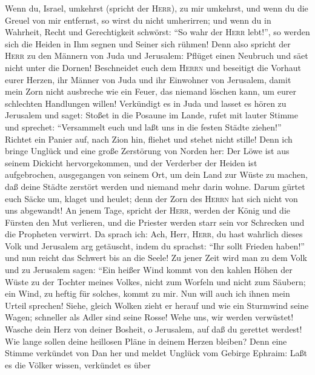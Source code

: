  Wenn du, Israel, umkehrst (spricht der \textsc{Herr}), zu
mir umkehrst, und wenn du die Greuel von mir entfernst, so wirst du
nicht umherirren;  und wenn du in Wahrheit, Recht und
Gerechtigkeit schwörst: ``So wahr der \textsc{Herr} lebt!'', so werden
sich die Heiden in Ihm segnen und Seiner sich rühmen! 
Denn also spricht der \textsc{Herr} zu den Männern von Juda und
Jerusalem: Pflüget einen Neubruch und säet nicht unter die Dornen!
 Beschneidet euch dem \textsc{Herrn} und beseitigt die
Vorhaut eurer Herzen, ihr Männer von Juda und ihr Einwohner von
Jerusalem, damit mein Zorn nicht ausbreche wie ein Feuer, das niemand
löschen kann, um eurer schlechten Handlungen willen! 
Verkündigt es in Juda und lasset es hören zu Jerusalem und saget: Stoßet
in die Posaune im Lande, rufet mit lauter Stimme und sprechet:
``Versammelt euch und laßt uns in die festen Städte ziehen!''
 Richtet ein Panier auf, nach Zion hin, fliehet und stehet
nicht stille! Denn ich bringe Unglück und eine große Zerstörung von
Norden her:  Der Löwe ist aus seinem Dickicht
hervorgekommen, und der Verderber der Heiden ist aufgebrochen,
ausgegangen von seinem Ort, um dein Land zur Wüste zu machen, daß deine
Städte zerstört werden und niemand mehr darin wohne. 
Darum gürtet euch Säcke um, klaget und heulet; denn der Zorn des
\textsc{Herrn} hat sich nicht von uns abgewandt!  An jenem
Tage, spricht der \textsc{Herr}, werden der König und die Fürsten den
Mut verlieren, und die Priester werden starr sein vor Schrecken und die
Propheten verwirrt.  Da sprach ich: Ach, Herr,
\textsc{Herr}, du hast wahrlich dieses Volk und Jerusalem arg getäuscht,
indem du sprachst: ``Ihr sollt Frieden haben!'' und nun reicht das
Schwert bis an die Seele!  Zu jener Zeit wird man zu dem
Volk und zu Jerusalem sagen: ``Ein heißer Wind kommt von den kahlen
Höhen der Wüste zu der Tochter meines Volkes, nicht zum Worfeln und
nicht zum Säubern;  ein Wind, zu heftig für solches,
kommt zu mir. Nun will auch ich ihnen mein Urteil sprechen!
 Siehe, gleich Wolken zieht er herauf und wie ein
Sturmwind seine Wagen; schneller als Adler sind seine Rosse! Wehe uns,
wir werden verwüstet!  Wasche dein Herz von deiner
Bosheit, o Jerusalem, auf daß du gerettet werdest! Wie lange sollen
deine heillosen Pläne in deinem Herzen bleiben?  Denn
eine Stimme verkündet von Dan her und meldet Unglück vom Gebirge
Ephraim:  Laßt es die Völker wissen, verkündet es über
